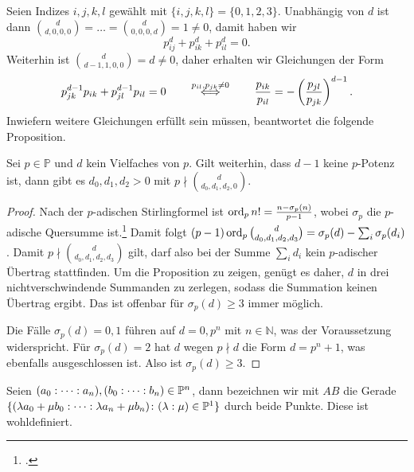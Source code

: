 Seien Indizes $i,j,k,l$ gewählt mit $\{i,j,k,l\} = \{0,1,2,3\}$. Unabhängig von $d$ ist dann $\binom d{d,0,0,0} = \dots = \binom d{0,0,0,d} = 1 \neq 0$, damit haben wir
\begin{equation} \label{eq:powers}
p_{ij}^d + p_{ik}^d + p_{il}^d = 0.
\end{equation}
Weiterhin ist $\binom d{d-1,1,0,0} = d \neq 0$, daher erhalten wir Gleichungen der Form
\begin{equation} \label{eq:ratios}
p_{jk}^{d-1} p_{ik} + p_{jl}^{d-1} p_{il} = 0 \qquad\overrel\Longleftrightarrow^{p_{il}, p_{jk} \neq 0}\qquad \frac{p_{ik}}{p_{il}} = -\left(\frac{p_{jl}}{p_{jk}}\right)^{d-1}.
\end{equation}
Inwiefern weitere Gleichungen erfüllt sein müssen, beantwortet die folgende Proposition.
\begin{prop}
Sei $p \in \mathbb P$ und $d$ kein Vielfaches von $p$. Gilt weiterhin, dass $d-1$ keine $p$-Potenz ist, dann gibt es $d_0, d_1, d_2 > 0$ mit $p \nmid \binom d{d_0,d_1,d_2,0}$.
\end{prop}
\begin{proof}
Nach der $p$-adischen Stirlingformel ist $\operatorname{ord}_p n! = \frac{n - \sigma_p(n)}{p-1}$, wobei $\sigma_p$ die $p$-adische Quersumme ist.\footcite[Kap.~2, §8, Lemma~1, S.~171]{LieGroups} Damit folgt $(p-1)\operatorname{ord}_p \binom d{d_0,d_1,d_2,d_3} = \sigma_p(d) - \sum_i \sigma_p(d_i)$. Damit $p \nmid \binom d{d_0,d_1,d_2,d_3}$ gilt, darf also bei der Summe $\sum_i d_i$ kein $p$-adischer Übertrag stattfinden. Um die Proposition zu zeigen, genügt es daher, $d$ in drei nichtverschwindende Summanden zu zerlegen, sodass die Summation keinen Übertrag ergibt. Das ist offenbar für $\sigma_p(d) \geq 3$ immer möglich.

Die Fälle $\sigma_p(d) = 0, 1$ führen auf $d = 0, p^n$ mit $n \in \mathbb N$, was der Voraussetzung widerspricht. Für $\sigma_p(d) = 2$ hat $d$ wegen $p \nmid d$ die Form $d=p^n+1$, was ebenfalls ausgeschlossen ist. Also ist $\sigma_p(d) \geq 3$.
\end{proof}

Seien $(a_0:\dots:a_n), (b_0:\dots:b_n) \in \mathbb P^{n}$, dann bezeichnen wir mit $AB$ die Gerade $\{(\lambda a_0 + \mu b_0 : \dots : \lambda a_n + \mu b_n) \colon (\lambda:\mu) \in \mathbb P^{1}\}$ durch beide Punkte. Diese ist wohldefiniert.


